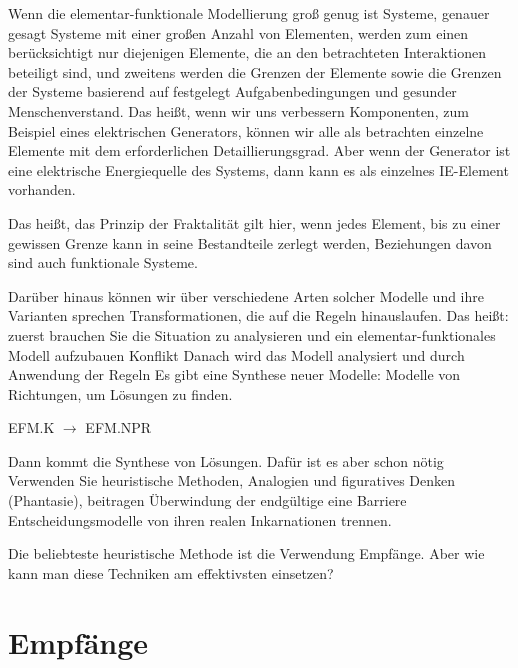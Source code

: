 \documentclass[11pt,a4paper]{article}
\begin{document}
Wenn die elementar-funktionale Modellierung groß genug ist Systeme, genauer
gesagt Systeme mit einer großen Anzahl von Elementen, werden zum einen
berücksichtigt nur diejenigen Elemente, die an den betrachteten Interaktionen
beteiligt sind, und zweitens werden die Grenzen der Elemente sowie die Grenzen
der Systeme basierend auf festgelegt Aufgabenbedingungen und gesunder
Menschenverstand. Das heißt, wenn wir uns verbessern Komponenten, zum Beispiel
eines elektrischen Generators, können wir alle als betrachten einzelne
Elemente mit dem erforderlichen Detaillierungsgrad. Aber wenn der Generator
ist eine elektrische Energiequelle des Systems, dann kann es als einzelnes
IE-Element vorhanden.

Das heißt, das Prinzip der Fraktalität gilt hier, wenn jedes Element, bis zu
einer gewissen Grenze kann in seine Bestandteile zerlegt werden, Beziehungen
davon sind auch funktionale Systeme.

Darüber hinaus können wir über verschiedene Arten solcher Modelle und ihre
Varianten sprechen Transformationen, die auf die Regeln hinauslaufen. Das
heißt: zuerst brauchen Sie die Situation zu analysieren und ein
elementar-funktionales Modell aufzubauen Konflikt Danach wird das Modell
analysiert und durch Anwendung der Regeln Es gibt eine Synthese neuer Modelle:
Modelle von Richtungen, um Lösungen zu finden.
\begin{center}
  EFM.K $\to$ EFM.NPR
\end{center}
Dann kommt die Synthese von Lösungen. Dafür ist es aber schon nötig Verwenden
Sie heuristische Methoden, Analogien und figuratives Denken (Phantasie),
beitragen Überwindung der endgültige eine Barriere Entscheidungsmodelle von
ihren realen Inkarnationen trennen.

Die beliebteste heuristische Methode ist die Verwendung Empfänge. Aber wie
kann man diese Techniken am effektivsten einsetzen?

\section*{Empfänge}
\end{document}

